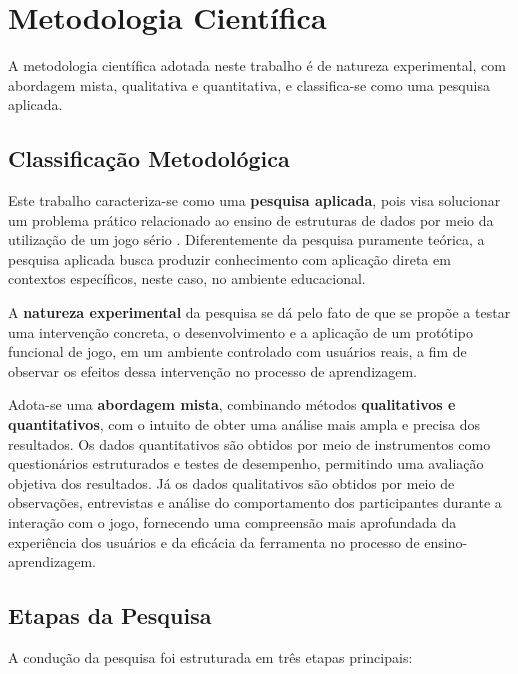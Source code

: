 \section{Metodologia Científica}

A metodologia científica adotada neste trabalho é de natureza experimental, com abordagem mista, qualitativa e quantitativa, e classifica-se como uma pesquisa aplicada.

\subsection{Classificação Metodológica}

Este trabalho caracteriza-se como uma \textbf{pesquisa aplicada}, pois visa solucionar um problema prático relacionado ao ensino de estruturas de dados por meio da utilização de um jogo sério \cite{mouaheb2012serious}. Diferentemente da pesquisa puramente teórica, a pesquisa aplicada busca produzir conhecimento com aplicação direta em contextos específicos, neste caso, no ambiente educacional.

A \textbf{natureza experimental} da pesquisa se dá pelo fato de que se propõe a testar uma intervenção concreta, o desenvolvimento e a aplicação de um protótipo funcional de jogo, em um ambiente controlado com usuários reais, a fim de observar os efeitos dessa intervenção no processo de aprendizagem.

Adota-se uma \textbf{abordagem mista}, combinando métodos \textbf{qualitativos e quantitativos}, com o intuito de obter uma análise mais ampla e precisa dos resultados. Os dados quantitativos são obtidos por meio de instrumentos como questionários estruturados e testes de desempenho, permitindo uma avaliação objetiva dos resultados. Já os dados qualitativos são obtidos por meio de observações, entrevistas e análise do comportamento dos participantes durante a interação com o jogo, fornecendo uma compreensão mais aprofundada da experiência dos usuários e da eficácia da ferramenta no processo de ensino-aprendizagem.

\subsection{Etapas da Pesquisa}

A condução da pesquisa foi estruturada em três etapas principais:

